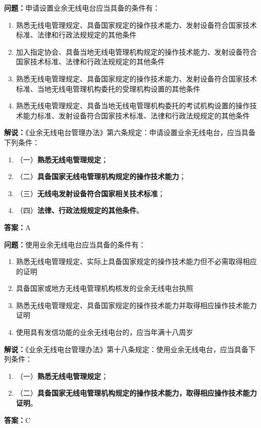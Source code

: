 \documentclass{ctexbook}
\begin{document}
\bigskip


\noindent\textbf{问题：}申请设置业余无线电台应当具备的条件有：
\begin{enumerate}[label=\Alph*), leftmargin=3em]
	\item 熟悉无线电管理规定、具备国家规定的操作技术能力、发射设备符合国家技术标准、法律和行政法规规定的其他条件
	\item 加入指定协会、具备当地无线电管理机构规定的操作技术能力、发射设备符合国家技术标准、法律和行政法规规定的其他条件
	\item 熟悉无线电管理规定、具备国家规定的操作技术能力、发射设备符合国家技术标准、当地无线电管理机构委托的受理机构设置的其他条件
	\item 熟悉无线电管理规定、具备当地无线电管理机构委托的考试机构设置的操作技术能力标准、发射设备符合国家技术标准、法律和行政法规规定的其他条件
\end{enumerate}
\noindent\textbf{解说：}《业余无线电台管理办法》第六条规定：申请设置业余无线电台，应当具备下列条件：
\begin{enumerate}[label=, leftmargin=1em]
	\item （一）\textbf{熟悉无线电管理规定}；
	\item （二）\textbf{具备国家无线电管理机构规定的操作技术能力}；
	\item （三）\textbf{无线电发射设备符合国家相关技术标准}；
	\item （四）\textbf{法律、行政法规规定的其他条件}。
\end{enumerate}
\noindent\textbf{答案：}A


\bigskip


\noindent\textbf{问题：}使用业余无线电台应当具备的条件有：
\begin{enumerate}[label=\Alph*), leftmargin=3em]
	\item 熟悉无线电管理规定、实际上具备国家规定的操作技术能力但不必需取得相应的证明
	\item 具备国家或地方无线电管理机构核发的业余无线电台执照
	\item 熟悉无线电管理规定、具备国家规定的操作技术能力并取得相应操作技术能力证明
	\item 使用具有发信功能的业余无线电台的，应当年满十八周岁
\end{enumerate}
\noindent\textbf{解说：}《业余无线电台管理办法》第十八条规定：使用业余无线电台，应当具备下列条件：
\begin{enumerate}[label=, leftmargin=1em]
	\item（一）\textbf{熟悉无线电管理规定}；
	\item（二）\textbf{具备国家无线电管理机构规定的操作技术能力，取得相应操作技术能力证明}。
\end{enumerate}
\noindent\textbf{答案：}C
\end{document}
